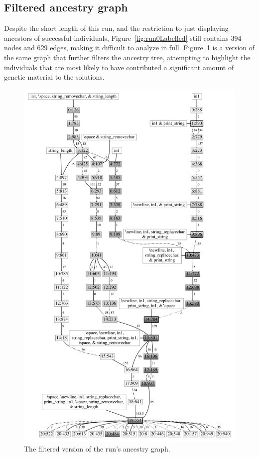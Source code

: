 \subsection{Filtered ancestry graph}

Despite the short length of this run, and the restriction to just displaying
ancestors of successful individuals, Figure~\ref{fig:run0Labelled} still
contains 394 nodes and 629 edges, making it difficult to analyze in full.
Figure~\ref{fig:run0Filtered} is a version of the same graph that further
filters the ancestry tree, attempting to highlight the individuals that
are most likely to have contributed a significant amount of genetic material
to the solutions.

\begin{figure}[tb!p] %
	\begin{center}
		\includegraphics[height=\textheight]{../figures/filtered_fill}
	\end{center}
	\caption{The filtered version of the run's ancestry graph.}
	\label{fig:run0Filtered}       %
\end{figure}

